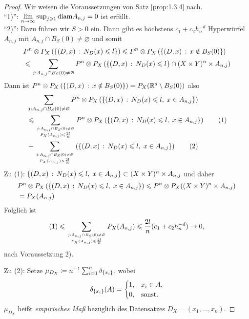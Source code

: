 \begin{proof}
Wir weisen die Voraussetzungen von Satz \ref{prop:1.3.4} nach.\\
``1)'': $\lim\limits_{n\to\infty} \sup_{j\geqslant 1} \mathrm{diam} A_{n,j} = 0$ ist
erfüllt.\\
``2)'': Dazu führen wir $S>0$ ein. Dann gibt es höchstens $c_1+c_2
h_n^{-d}$ Hyperwürfel $A_{n,j}$ mit $A_{n,j}\cap B_S(0)\neq \varnothing$ und somit
\begin{align*}
&P^n\otimes P_X\left(\left\{ (D,x)\,:\,N_D(x)\leqslant l\right\} \right)
\leqslant P^n\otimes P_X\left(\left\{ (D,x)\,:\,x\notin B_S(0)\right\} \right)\\
&\leqslant
\sum_{j:A_{n,j}\cap B_S(0)\neq \varnothing} P^n\otimes P_X
\left(\left\{ (D,x)\,:\,N_D(x)\leqslant l\right\}\cap (X\times Y)^n\times A_{n,j}\right)
\end{align*}
Dann ist $P^n\otimes P_X\left(\left\{ (D,x)\,:\,x\notin B_S(0)\right\} \right) =
P_X(\mathbb{R}^d\setminus B_S(0))$ also
\begin{align*}
&\sum_{j:A_{n,j}\cap B_S(0)\neq \varnothing} P^n\otimes P_X
\left(\setdef{(D,x)}{N_D(x)\le l,\; x\in A_{n,j}}\right)\\
&\le 
\sum_{\atop{j:A_{n,j}\cap B_S(0)\neq \varnothing}{P_X(A_{n,j})\le \frac{2l}{n}}}
P^n\otimes P_X \left(\setdef{(D,x)}{N_D(x)\le l,\; x\in
A_{n,j}}\right)\tag{1}\\ &+
\sum_{\atop{j:A_{n,j}\cap B_S(0)\neq \varnothing}{P_X(A_{n,j})> \frac{2l}{n}}}
\left(\setdef{(D,x)}{N_D(x)\le l,\; x\in A_{n,j}}\right)\tag{2}
\end{align*}
 Zu (1): $\left\{ (D,x)\,:\,N_D(x)\leqslant l,\; x\in A_{n,j}\right\}\subset (X\times
 Y)^n\times A_{n,j}$ und daher
 \begin{align*}
 &P^n\otimes P_X\left(\left\{ (D,x)\,:\,N_D(x)\leqslant l,\; x\in A_{n,j}\right\}\right)
 \leqslant P^n\otimes P_X((X\times Y)^n\times A_{n,j})\\
 &= P_X(A_{n,j})
 \end{align*}
Folglich ist
\begin{align*}
\text{(1)} \le
\sum_{\atop{j:A_{n,j}\cap B_S(0)\neq \varnothing}{P_X(A_{n,j})\le \frac{2l}{n}}}
P_X(A_{n,j})
\le
\frac{2l}{n}
(c_1+c_2h_n^{-d}) \to 0,
\end{align*}
nach Voraussetzung 2).

Zu (2): Setze $\mu_{D_X} \coloneq n^{-1} \sum_{i=1}^n \delta_{\left\{ x_i \right\}}$, wobei
\begin{align*}
\delta_{\left\{ x_i \right\}}(A) = 
\begin{cases}
1, & x_i\in A,\\
0, & \text{sonst}.
\end{cases}
\end{align*}
$\mu_{D_X}$ heißt \emph{empirisches Maß}
bezüglich des Datensatzes
$D_X=(x_1,\ldots,x_n)$.


\end{proof}
